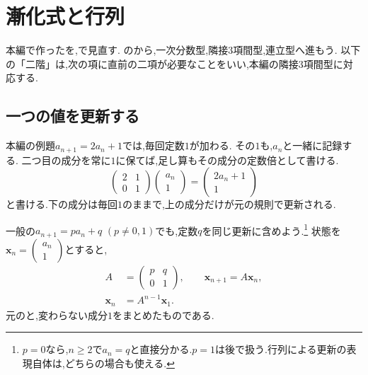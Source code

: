 
\section{漸化式と行列}\label{節：漸化式と行列}

本編で作ったを,で見直す.
のから,一次分数型,隣接3項間型,連立型へ進もう.
以下の「二階」は,次の項に直前の二項が必要なことをいい,本編の隣接3項間型に対応する.

\subsection{一つの値を更新する}\label{節：一つの値を更新する}

本編の例題$a_{n+1}=2a_n+1$では,毎回定数$1$が加わる.
その$1$も,$a_n$と一緒に記録する.
二つ目の成分を常に$1$に保てば,足し算もその成分の定数倍として書ける.
\[
  \begin{pmatrix}2&1\\0&1\end{pmatrix}
  \begin{pmatrix}a_n\\1\end{pmatrix}
  =\begin{pmatrix}2a_n+1\\1\end{pmatrix}
\]
と書ける.下の成分は毎回$1$のままで,上の成分だけが元の規則で更新される.

一般の$a_{n+1}=pa_n+q$ $(p\ne0,1)$でも,定数$q$を同じ更新に含めよう.\footnote{$p=0$なら,$n\ge2$で$a_n=q$と直接分かる.$p=1$は後で扱う.行列による更新の表現自体は,どちらの場合も使える.}
状態を$\boldsymbol{x}_n=\begin{pmatrix}a_n\\1\end{pmatrix}$とすると,
\[
  \begin{aligned}
    A&=\begin{pmatrix}p&q\\0&1\end{pmatrix},\qquad
    \boldsymbol{x}_{n+1}=A\boldsymbol{x}_n,\\
    \boldsymbol{x}_n&=A^{n-1}\boldsymbol{x}_1.
  \end{aligned}
\]
元のと,変わらない成分$1$をまとめたものである.

